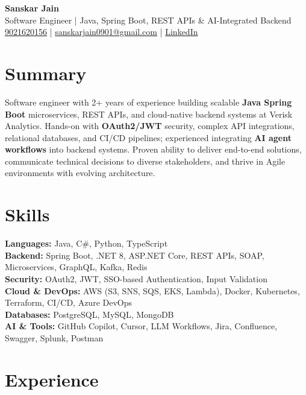 \documentclass[letterpaper,10pt]{article}
\begin{document}
\begin{center}
    {\LARGE \textbf{Sanskar Jain}} \\
    \vspace{2pt}
    Software Engineer | Java, Spring Boot, REST APIs \& AI-Integrated Backend \\
    \vspace{2pt}
    \href{tel:9021620156}{9021620156} \;|\;
    \href{mailto:sanskarjain0901@gmail.com}{sanskarjain0901@gmail.com} \;|\;
    \href{https://www.linkedin.com/in/sanskar-jain0901/}{LinkedIn}
\end{center}

\vspace{3pt}

\section*{Summary}
Software engineer with 2+ years of experience building scalable \textbf{Java Spring Boot} microservices, REST APIs, and cloud-native backend systems at Verisk Analytics.
Hands-on with \textbf{OAuth2/JWT} security, complex API integrations, relational databases, and CI/CD pipelines; experienced integrating \textbf{AI agent workflows} into backend systems.
Proven ability to deliver end-to-end solutions, communicate technical decisions to diverse stakeholders, and thrive in Agile environments with evolving architecture.

\section*{Skills}
\textbf{Languages:} Java, C\#, Python, TypeScript \\
\textbf{Backend:} Spring Boot, .NET 8, ASP.NET Core, REST APIs, SOAP, Microservices, GraphQL, Kafka, Redis \\
\textbf{Security:} OAuth2, JWT, SSO-based Authentication, Input Validation \\
\textbf{Cloud \& DevOps:} AWS (S3, SNS, SQS, EKS, Lambda), Docker, Kubernetes, Terraform, CI/CD, Azure DevOps \\
\textbf{Databases:} PostgreSQL, MySQL, MongoDB \\
\textbf{AI \& Tools:} GitHub Copilot, Cursor, LLM Workflows, Jira, Confluence, Swagger, Splunk, Postman

\section*{Experience}
\end{document}
